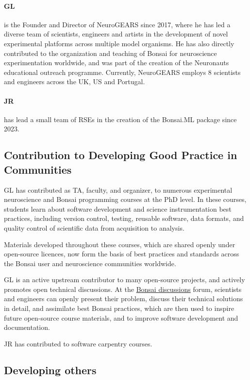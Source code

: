\paragraph{GL} is the Founder and Director of NeuroGEARS since 2017, where he has led a diverse team of scientists, engineers and artists in the development of novel experimental platforms across multiple model organisms. He has also directly contributed to the organization and teaching of Bonsai for neuroscience experimentation worldwide, and was part of the creation of the Neuronauts educational outreach programme. Currently, NeuroGEARS employs 8 scientists and engineers across the UK, US and Portugal.

\paragraph{JR} has lead a small team of RSEs in the
creation of the Bonsai.ML package since 2023.

\subsection{Contribution to Developing Good Practice in Communities}

GL has contributed as TA, faculty, and organizer, to numerous experimental neuroscience and Bonsai programming courses at the PhD level. In these courses, students learn about software development and science instrumentation best practices, including version control, testing, reusable software, data formats, and quality control of scientific data from acquisition to analysis.

Materials developed throughout these courses, which are shared openly under open-source licences, now form the basis of best practices and standards across the Bonsai user and neuroscience communities worldwide.

GL is an active upstream contributor to many open-source projects, and actively promotes open technical discussions. At the \href{https://github.com/orgs/bonsai-rx/discussions}{Bonsai discussions} forum, scientists and engineers can openly present their problem, discuss their technical solutions in detail, and assimilate best
Bonsai practices, which are then used to inspire future open-source course materials, and to improve software development and documentation.

JR has contributed to software carpentry courses.


\subsection{Developing others}

